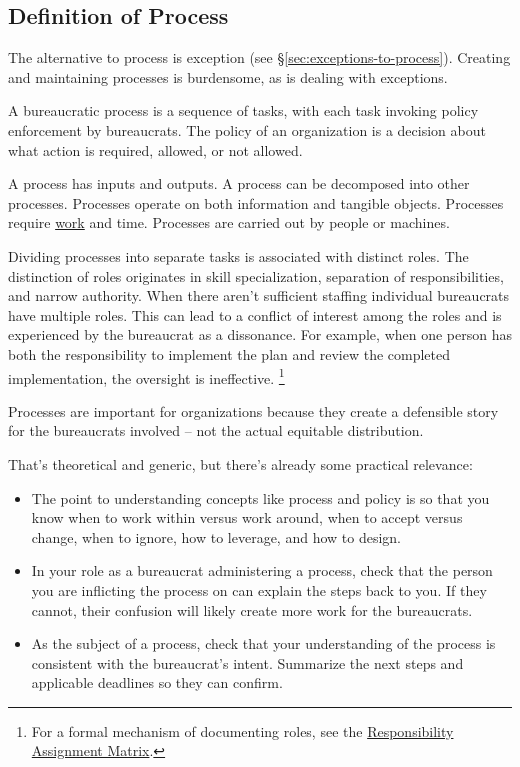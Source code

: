 \subsection{Definition of Process\label{sec:definition-of-process}}

The alternative to process is exception (see \S\ref{sec:exceptions-to-process}). Creating and maintaining processes is burdensome, as is dealing with exceptions. 


A bureaucratic \gls{process} is a sequence of tasks, with each task invoking policy enforcement by bureaucrats. 
The policy of an organization is a decision about what action is required, allowed, or not allowed.


A process has inputs and outputs. 
A process can be decomposed into other processes. 
Processes operate on both information and tangible objects. 
Processes require \href{https://en.wikipedia.org/wiki/Work_(physics)}{work} and time. 
Processes are carried out by people or machines.

Dividing processes into separate tasks is associated with distinct roles. The distinction of roles originates in skill specialization, separation of responsibilities, and narrow authority. 
When there aren't sufficient staffing individual bureaucrats have multiple roles. This can lead to a conflict of interest among the roles and is experienced by the bureaucrat as a dissonance. For example, when one person has both the responsibility to implement the plan and review the completed implementation, the oversight is ineffective. \footnote{For a formal mechanism of documenting roles, see the 
\href{https://en.wikipedia.org/wiki/Responsibility_assignment_matrix}{Responsibility Assignment Matrix}.
}


Processes are important for organizations because they create a defensible story for the bureaucrats involved -- not the actual equitable distribution.

That's theoretical and generic, but there's already some practical relevance:
\begin{itemize}
\item The point to understanding concepts like process and policy is so that you know when to work within versus work around, when to accept versus change, when to ignore, how to leverage, and how to design.
    \item In your role as a bureaucrat administering a process, check that the person you are inflicting the process on can explain the steps back to you. If they cannot, their confusion will likely create more work for the bureaucrats. 
    \item As the subject of a process, check that your understanding of the process is consistent with the bureaucrat's intent. Summarize the next steps and applicable deadlines so they can confirm. 
\end{itemize}

